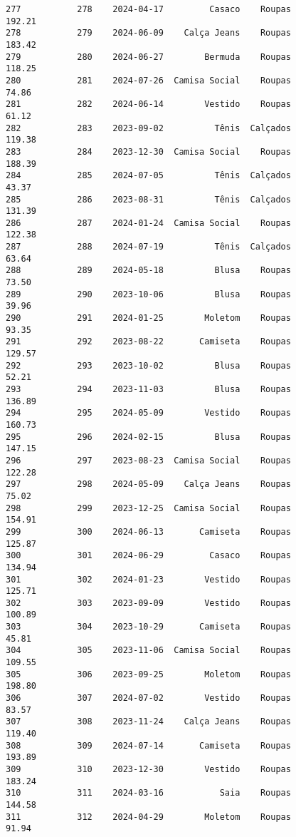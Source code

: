 \documentclass[11pt]{article}
\begin{document}
\begin{Verbatim}[commandchars=\\\{\}]
277           278    2024-04-17         Casaco    Roupas          192.21   
278           279    2024-06-09    Calça Jeans    Roupas          183.42   
279           280    2024-06-27        Bermuda    Roupas          118.25   
280           281    2024-07-26  Camisa Social    Roupas           74.86   
281           282    2024-06-14        Vestido    Roupas           61.12   
282           283    2023-09-02          Tênis  Calçados          119.38   
283           284    2023-12-30  Camisa Social    Roupas          188.39   
284           285    2024-07-05          Tênis  Calçados           43.37   
285           286    2023-08-31          Tênis  Calçados          131.39   
286           287    2024-01-24  Camisa Social    Roupas          122.38   
287           288    2024-07-19          Tênis  Calçados           63.64   
288           289    2024-05-18          Blusa    Roupas           73.50   
289           290    2023-10-06          Blusa    Roupas           39.96   
290           291    2024-01-25        Moletom    Roupas           93.35   
291           292    2023-08-22       Camiseta    Roupas          129.57   
292           293    2023-10-02          Blusa    Roupas           52.21   
293           294    2023-11-03          Blusa    Roupas          136.89   
294           295    2024-05-09        Vestido    Roupas          160.73   
295           296    2024-02-15          Blusa    Roupas          147.15   
296           297    2023-08-23  Camisa Social    Roupas          122.28   
297           298    2024-05-09    Calça Jeans    Roupas           75.02   
298           299    2023-12-25  Camisa Social    Roupas          154.91   
299           300    2024-06-13       Camiseta    Roupas          125.87   
300           301    2024-06-29         Casaco    Roupas          134.94   
301           302    2024-01-23        Vestido    Roupas          125.71   
302           303    2023-09-09        Vestido    Roupas          100.89   
303           304    2023-10-29       Camiseta    Roupas           45.81   
304           305    2023-11-06  Camisa Social    Roupas          109.55   
305           306    2023-09-25        Moletom    Roupas          198.80   
306           307    2024-07-02        Vestido    Roupas           83.57   
307           308    2023-11-24    Calça Jeans    Roupas          119.40   
308           309    2024-07-14       Camiseta    Roupas          193.89   
309           310    2023-12-30        Vestido    Roupas          183.24   
310           311    2024-03-16           Saia    Roupas          144.58   
311           312    2024-04-29        Moletom    Roupas           91.94   

\end{Verbatim}
\end{document}
